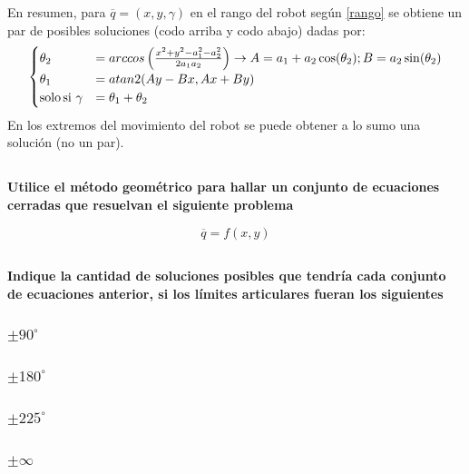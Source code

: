 \documentclass[a4paper,12pt]{article}
\begin{document}
En resumen, para $\overline{q} = (x, y, \gamma)$ en el rango del robot según \cref{rango} se obtiene un par de posibles soluciones (codo arriba y codo abajo) dadas por:
\begin{align}
    \begin{cases}
        \theta_2 &= arccos\left(\frac{x^2 + y^2 - a_{1}^2 - a_{2}^2}{2a_{1}a_{2}}\right) \rightarrow A = a_1 + a_2\cos(\theta_2); B = a_2\sin(\theta_2)\\
        \theta_1 &=  atan2(Ay-Bx, Ax + By)\\
        \text{solo\,si}\,\,\gamma &= \theta_1 + \theta_2
    \end{cases}
\end{align}
En los extremos del movimiento del robot se puede obtener a lo sumo una solución (no un par).



\subsection{}
\textbf{Utilice el método geométrico para hallar un conjunto de ecuaciones cerradas que resuelvan el siguiente problema}

\begin{equation*}
    \overline{q} = f\left(x,y\right)
\end{equation*}

\subsection{}
\textbf{Indique la cantidad de soluciones posibles que tendría cada conjunto de ecuaciones anterior, si los límites articulares fueran los siguientes}
\subsubsection*{$\pm 90^\circ$}
\subsubsection*{$\pm 180^\circ$}
\subsubsection*{$\pm 225^\circ$}
\subsubsection*{$\pm \infty$}

\end{document}
